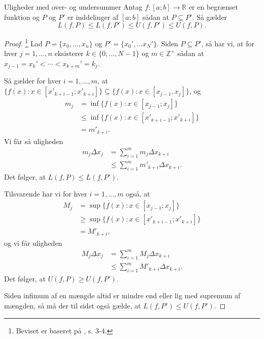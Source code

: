 \begin{theorem}[label=theo:ulighed_overundersum]{Uligheder med over- og undersummer}{}
  Antag $f:[a;b] \to \mathbb{R}$ er en begrænset funktion og $P$ og $P'$ er inddelinger af $[a;b]$ sådan at $P \subseteq P'$. Så gælder
  \[
  L(f,P)\leq L(f,P') \leq  U(f,P') \leq U(f,P).
  \] 
\end{theorem}
\begin{proof} 
  \footnote{Beviset er baseret på \cite{Axler2020}, s. 3-4.} 
  Lad $P=\{ x_0,\ldots , x_n \} $ og $P'=\{x_0',\ldots x_N'\}$. 
  Siden $P \subseteq P'$, så har vi, at for hver $j=1,\ldots , n$ eksisterer $k \in \{ 0,\ldots , N-1 \} $ og $m \in \mathbb{Z}^+$ sådan at $x _{j-1} =x_k'< \cdots < x _{k+m}'=k_j$.

  Så gælder for hver $i=1, \ldots , m$, at ${\{ f(x):x \in [x'_{k+i-1};x'_{k+i }] \} \subseteq \{ f(x):x \in [x_{j-1},x_j]\}  }$, og 
  \begin{equation*}
  \begin{split}
   m_j&=\inf \{ f(x):x \in [x_{j-1};x_j]\} \\
    &\leq  \inf \{ f(x):x \in [x'_{k+i-1};x'_{k+i }] \}\\
    &=m'_{k+i}.
  \end{split}
  \end{equation*}
Vi får så uligheden 
\begin{equation*}
\begin{split}
  m_j \Delta x_j&=\sum_{i=1}^{m} m_j \Delta x _{k+i}\\
  &\leq \sum_{i=1}^{m} m' _{k+i} \Delta x _{k+i}.
\end{split}
\end{equation*}
  Det følger, at $L(f,P) \leq L(f,P')$. 

  Tilsvarende har vi for hver $i=1,\ldots, m$ også, at
  \begin{equation*}
  \begin{split}
    M_j&=\sup \{ f(x):x \in [x_{j-1};x_j] \} \\
    &\geq \sup \{ f(x):x \in [x'_{k+i-1};x'_{k+i}] \} \\
    &=M'_{k+i},
  \end{split}
  \end{equation*}
  og vi får uligheden
  \begin{equation*}
  \begin{split}
  M_j \Delta x_j&=\sum_{i=1}^{m} M_j \Delta x _{k+i}\\
  &\leq \sum_{i=1}^{m} M' _{k+i} \Delta x _{k+i}.
  \end{split}
  \end{equation*}
  Det følger, at $U(f,P) \geq U(f,P')$.

  Siden infimum af en mængde altid er mindre end eller lig med supremum af mængden, så må der til sidst også gælde, at $L(f,P')\leq U(f,P')$.
\end{proof}

